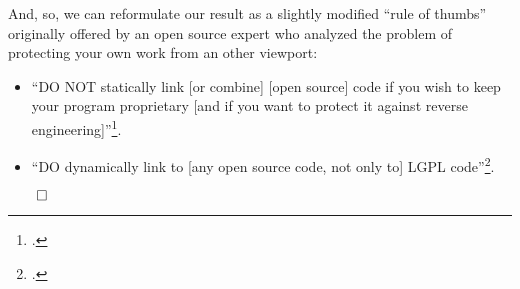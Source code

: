 And, so, we can reformulate our result as a slightly modified \enquote{rule of
thumbs} originally offered by an open source expert who analyzed the problem of
protecting your own work from an other viewport:

\begin{itemize}
  \item \enquote{DO NOT statically link [or combine] [open source] code if you
  wish to keep your program proprietary [and if you want to protect it against reverse
  engineering]}\footcite[cf.][6; bracketed text KR.]{Ilardi2010a}.
  \item \enquote{DO dynamically link to [any open source code, not only to] LGPL
  code}\footcite[cf.][6; bracketed text KR.]{Ilardi2010a}.
\end{itemize}

$\qed$


